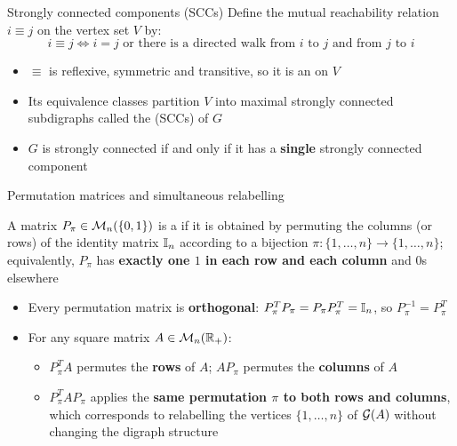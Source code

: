 \documentclass[aspectratio=169]{beamer}\usepackage[]{graphicx}\usepackage[]{xcolor}
\begin{document}
\begin{frame}{Strongly connected components (SCCs)}
Define the mutual reachability relation $i \equiv j$ on the vertex set $V$ by:
\[
i \equiv j \iff i = j \text{ or there is a directed walk from } i \text{ to } j \text{ and from } j \text{ to } i
\]
\vfill
\begin{itemize}
\item $\equiv$ is reflexive, symmetric and transitive, so it is an  on $V$
\item Its equivalence classes partition $V$ into maximal strongly connected subdigraphs called the  (SCCs) of $G$
\item $G$ is strongly connected if and only if it has a \textbf{single} strongly connected component
\end{itemize}
\end{frame}

\begin{frame}{Permutation matrices and simultaneous relabelling}
\begin{importantdefinition}
\label{def:permutation-matrix}
A matrix $P_\pi \in \mathcal{M}_n(\{0, 1\})$ is a  if it is obtained by permuting the columns (or rows) of the identity matrix $\mathbb{I}_n$ according to a bijection $\pi : \{1, \ldots, n\} \to \{1, \ldots, n\}$; equivalently, $P_\pi$ has \textbf{exactly one $1$ in each row and each column} and $0$s elsewhere
\end{importantdefinition}
\vfill
\begin{itemize}
\item Every permutation matrix is \textbf{orthogonal}: $P_\pi^T P_\pi = P_\pi P_\pi^T = \mathbb{I}_n$, so $P_\pi^{-1} = P_\pi^T$
\vfill
\item For any square matrix $A \in \mathcal{M}_n(\mathbb{R}_+)$:
\begin{itemize}
\item $P_\pi^T A$ permutes the \textbf{rows} of $A$; $A P_\pi$ permutes the \textbf{columns} of $A$
\item $P_\pi^T A P_\pi$ applies the \textbf{same permutation $\pi$ to both rows and columns}, which corresponds to relabelling the vertices $\{1, \ldots, n\}$ of $\mathcal{G}(A)$ without changing the digraph structure
\end{itemize}
\end{itemize}
\end{frame}
\end{document}
